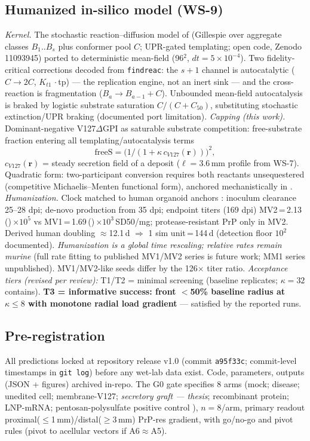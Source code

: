 \documentclass[10pt,twocolumn]{article}
\begin{document}
\subsection{Humanized in-silico model (WS-9)}
\emph{Kernel.} The stochastic reaction--diffusion model of \citet{fornara2024} (Gillespie over aggregate classes $B_1..B_s$ plus conformer pool $C$; UPR-gated templating; open code, Zenodo 11093945) ported to deterministic mean-field (96$^2$, $dt=5\times10^{-4}$). Two fidelity-critical corrections decoded from \texttt{findreac}: the $s{+}1$ channel is autocatalytic ($C\to2C$, $K_{t1}\,\cdot$tp) --- the replication engine, not an inert sink --- and the cross-reaction is fragmentation ($B_a\to B_{a-1}+C$). Unbounded mean-field autocatalysis is braked by logistic substrate saturation $C/(C+C_{50})$, substituting stochastic extinction/UPR braking (documented port limitation).
\emph{Capping (this work).} Dominant-negative V127$\Delta$GPI as saturable substrate competition: free-substrate fraction entering all templating/autocatalysis terms
\begin{equation}
\mathrm{freeS}=\big(1/(1+\kappa\,c_{V127}(\mathbf{r}))\big)^{2},
\end{equation}
$c_{V127}(\mathbf{r})$ = steady secretion field of a deposit ($\ell=3.6$\,mm profile from WS-7). Quadratic form: two-participant conversion requires both reactants unsequestered (competitive Michaelis--Menten functional form), anchored mechanistically in \citet{asante2015,gatdula2026,hosszu2020}.
\emph{Humanization.} Clock matched to human organoid anchors \citep{groveman2019}: inoculum clearance 25--28 dpi; de-novo production from 35 dpi; endpoint titers (169 dpi) MV2\,=\,2.13\,()\,$\times10^{5}$ vs MV1\,=\,1.69\,()\,$\times10^{3}$\,SD50/mg; protease-resistant PrP only in MV2. Derived human doubling $\approx$12.1\,d $\Rightarrow$ 1 sim unit\,=\,144\,d (detection floor $10^2$ documented). \emph{Humanization is a global time rescaling; relative rates remain murine} (full rate fitting to published MV1/MV2 series is future work; MM1 series unpublished). MV1/MV2-like seeds differ by the 126$\times$ titer ratio.
\emph{Acceptance tiers (revised per review):} T1/T2 = minimal screening (baseline replicates; $\kappa{=}32$ contains). \textbf{T3 = informative success: front $<$50\% baseline radius at $\kappa\le8$ with monotone radial load gradient} --- satisfied by the reported runs.

\subsection{Pre-registration}
All predictions locked at repository release v1.0 (commit \texttt{a95f33c}; commit-level timestamps in \texttt{git log}) before any wet-lab data exist. Code, parameters, outputs (JSON + figures) archived in-repo. The G0 gate specifies 8 arms (mock; disease; unedited cell; membrane-V127; \emph{secretory graft --- thesis}; recombinant protein; LNP-mRNA; pentosan-polysulfate positive control \citep{groveman2021pps}), $n=8$/arm, primary readout proximal($\le$1\,mm)/distal($\ge$3\,mm) PrP-res gradient, with go/no-go and pivot rules (pivot to acellular vectors if A6$\approx$A5).
\end{document}
